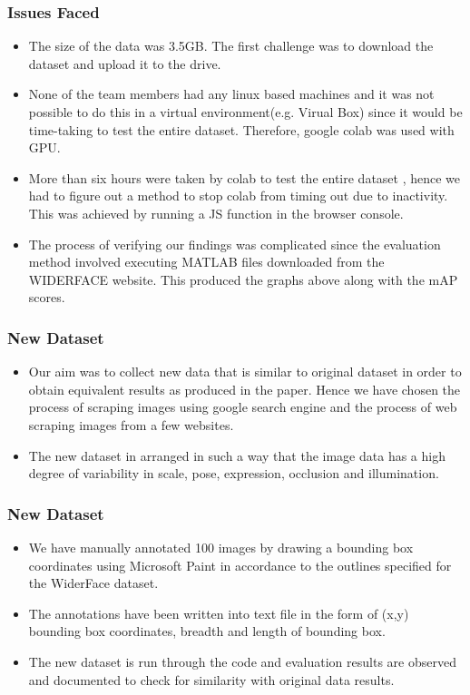 \documentclass[11pt]{beamer}
\begin{document}
\begin{frame}
\frametitle{Issues Faced}
\begin{itemize}
\item The size of the data was 3.5GB. The first challenge was to download the dataset and upload it to the drive.
\item None of the team members had any linux based machines and it was not possible to do this in a virtual environment(e.g. Virual Box) since it would be time-taking to test the entire dataset. Therefore, google colab was used with GPU.
\item More than six hours were taken by colab to test the entire dataset , hence we had to figure out a method to stop colab from timing out due to inactivity. This was achieved by running a JS function in the browser console. 
\item The process of verifying our findings was complicated since the evaluation method involved executing MATLAB files downloaded from the WIDERFACE website. This produced the graphs above along with the mAP scores. 
\end{itemize}
\end{frame}
\begin{frame}
	\frametitle{New Dataset}
	\begin{itemize}
\item Our aim was to collect new data that is similar to original dataset in order to obtain equivalent results as produced in the paper. Hence we have chosen the process of scraping images using google search engine and the process of web scraping images from a few websites.
\item The new dataset in arranged in such a way that the image data has a high degree of variability in scale, pose, expression, occlusion and illumination.
	\end{itemize}
\end{frame} 
\begin{frame}
	\frametitle{New Dataset}
\begin{itemize}
\item We have manually annotated 100 images by drawing a bounding box coordinates using Microsoft Paint in accordance to the outlines specified for the WiderFace dataset. 
\item The annotations have been written into text file in the form of (x,y) bounding box coordinates, breadth and length of bounding box. 
\item The new dataset is run through the code and evaluation results are observed and documented to check for similarity with original data results.
	\end{itemize}
\end{frame} 
\end{document}
